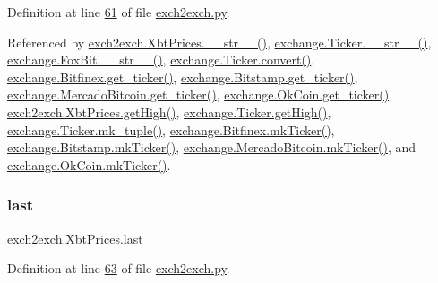 Definition at line \hyperlink{exch2exch_8py_source_l00061}{61} of file \hyperlink{exch2exch_8py_source}{exch2exch.\+py}.



Referenced by \hyperlink{exch2exch_8py_source_l00091}{exch2exch.\+Xbt\+Prices.\+\_\+\+\_\+str\+\_\+\+\_\+()}, \hyperlink{exchange_8py_source_l00136}{exchange.\+Ticker.\+\_\+\+\_\+str\+\_\+\+\_\+()}, \hyperlink{exchange_8py_source_l00610}{exchange.\+Fox\+Bit.\+\_\+\+\_\+str\+\_\+\+\_\+()}, \hyperlink{exchange_8py_source_l00069}{exchange.\+Ticker.\+convert()}, \hyperlink{exchange_8py_source_l00439}{exchange.\+Bitfinex.\+get\+\_\+ticker()}, \hyperlink{exchange_8py_source_l00511}{exchange.\+Bitstamp.\+get\+\_\+ticker()}, \hyperlink{exchange_8py_source_l00651}{exchange.\+Mercado\+Bitcoin.\+get\+\_\+ticker()}, \hyperlink{exchange_8py_source_l00716}{exchange.\+Ok\+Coin.\+get\+\_\+ticker()}, \hyperlink{exch2exch_8py_source_l00076}{exch2exch.\+Xbt\+Prices.\+get\+High()}, \hyperlink{exchange_8py_source_l00106}{exchange.\+Ticker.\+get\+High()}, \hyperlink{exchange_8py_source_l00121}{exchange.\+Ticker.\+mk\+\_\+tuple()}, \hyperlink{exchange_8py_source_l00453}{exchange.\+Bitfinex.\+mk\+Ticker()}, \hyperlink{exchange_8py_source_l00525}{exchange.\+Bitstamp.\+mk\+Ticker()}, \hyperlink{exchange_8py_source_l00665}{exchange.\+Mercado\+Bitcoin.\+mk\+Ticker()}, and \hyperlink{exchange_8py_source_l00730}{exchange.\+Ok\+Coin.\+mk\+Ticker()}.

\mbox{\label{classexch2exch_1_1_xbt_prices_a1da8993986574b27edcaf7259e78c899}} 
\subsubsection{\texorpdfstring{last}{last}}
{\footnotesize\ttfamily exch2exch.\+Xbt\+Prices.\+last}



Definition at line \hyperlink{exch2exch_8py_source_l00063}{63} of file \hyperlink{exch2exch_8py_source}{exch2exch.\+py}.



